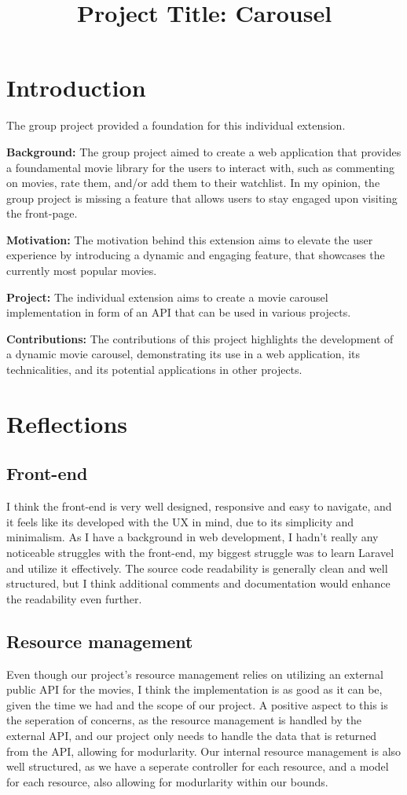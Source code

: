 \documentclass[letterpaper,twocolumn]{article}
\title{Project Title: Carousel}
\date{}
\begin{document}
\maketitle
\pagebreak
\section{Introduction}
The group project provided a foundation for this individual extension.

\textbf{Background:} %
The group project aimed to create a web application that provides a foundamental movie library for the users to interact with,
such as commenting on movies, rate them, and/or add them to their watchlist.
In my opinion, the group project is missing a feature that allows users to stay engaged upon visiting the front-page.

\textbf{Motivation:} %
The motivation behind this extension aims to elevate the user experience by introducing a dynamic and engaging feature, that showcases the currently most popular movies.

\textbf{Project:} %
The individual extension aims to create a movie carousel implementation in form of an API that can be used in various projects.

\textbf{Contributions:} %
The contributions of this project highlights the development of a dynamic movie carousel, demonstrating its use in a web application, its technicalities, and its potential applications in other projects.


\section{Reflections}
\subsection{Front-end} %
I think the front-end is very well designed, responsive and easy to navigate, and it feels like its developed with the UX in mind, due to its simplicity and minimalism.
As I have a background in web development, I hadn't really any noticeable struggles with the front-end, my biggest struggle was to learn Laravel and utilize it effectively.
The source code readability is generally clean and well structured, but I think additional comments and documentation would enhance the readability even further.

\subsection{Resource management}  %
Even though our project's resource management relies on utilizing an external public API for the movies, I think the implementation is as good as it can be, given the time we had and the scope of our project. 
A positive aspect to this is the seperation of concerns, as the resource management is handled by the external API, and our project only needs to handle the data that is returned from the API, allowing for modurlarity.
Our internal resource management is also well structured, as we have a seperate controller for each resource, and a model for each resource, also allowing for modurlarity within our bounds.
\end{document}
